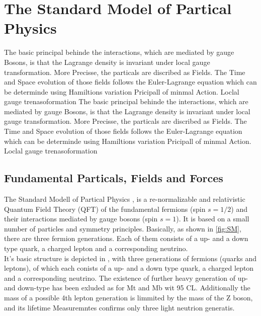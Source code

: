 \chapter{The Standard Model of Partical Physics}
\label{sec:SM}
The basic principal behinde the interactions, which are mediated by gauge Bosons, is  that the Lagrange density is invariant under local gauge transformation. More Precisse, the particals are discribed as Fields. The Time and Space evolution of those fields follows the Euler-Lagrange equation which can be determinde using Hamiltions variation Pricipall of minmal Action. 
Loclal gauge trenasoformation
The basic principal behinde the interactions, which are mediated by gauge Bosons, is  that the Lagrange density is invariant under local gauge transformation. More Precisse, the particals are discribed as Fields. The Time and Space evolution of those fields follows the Euler-Lagrange equation which can be determinde using Hamiltions variation Pricipall of minmal Action. 
Loclal gauge trenasoformation




\section{Fundamental  Particals, Fields and Forces }\label{key:SM 2}

The Standard Modell of Partical Physics \cite{glashow1961partial,glashow1970weak,gross1973asymptotically,politzer1973reliable,politzer1974asymptotic,salam1964electromagnetic,weinberg1967model}, is a re-normalizable and relativistic Quantum Field Theory (QFT) of the fundamental fermions (spin $s =1/2$) and their interactions mediated by gauge bosons (spin $s = 1$).  It is based on a small number of particles and symmetry principles. Basically, as shown in \cref{fig:SM}, there are three fermion generations. Each of them consists of  a up- and a down type quark, a charged lepton and a corresponding neutrino. \\ 

It's basic structure is depicted in   , with three generations of fermions (quarks and leptons), of which each conists of a up- and a down type quark, a charged lepton and a corresponding neutrino.  The existence of further heavy  generation of up- and down-type has been exluded as for Mt and Mb wit 95 CL.
Additionally the mass of a possible 4th lepton generation is limmited by the mass of the Z boson, and its lifetime Measuremntes confirms only three light neutrion generatis. \\ 





